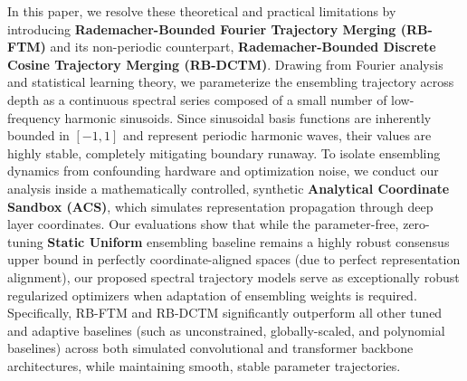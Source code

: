 In this paper, we resolve these theoretical and practical limitations by introducing \textbf{Rademacher-Bounded Fourier Trajectory Merging (RB-FTM)} and its non-periodic counterpart, \textbf{Rademacher-Bounded Discrete Cosine Trajectory Merging (RB-DCTM)}. Drawing from Fourier analysis and statistical learning theory, we parameterize the ensembling trajectory across depth as a continuous spectral series composed of a small number of low-frequency harmonic sinusoids. Since sinusoidal basis functions are inherently bounded in $[-1, 1]$ and represent periodic harmonic waves, their values are highly stable, completely mitigating boundary runaway. To isolate ensembling dynamics from confounding hardware and optimization noise, we conduct our analysis inside a mathematically controlled, synthetic \textbf{Analytical Coordinate Sandbox (ACS)}, which simulates representation propagation through deep layer coordinates. Our evaluations show that while the parameter-free, zero-tuning \textbf{Static Uniform} ensembling baseline remains a highly robust consensus upper bound in perfectly coordinate-aligned spaces (due to perfect representation alignment), our proposed spectral trajectory models serve as exceptionally robust regularized optimizers when adaptation of ensembling weights is required. Specifically, RB-FTM and RB-DCTM significantly outperform all other tuned and adaptive baselines (such as unconstrained, globally-scaled, and polynomial baselines) across both simulated convolutional and transformer backbone architectures, while maintaining smooth, stable parameter trajectories.

